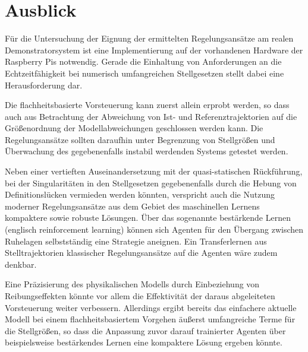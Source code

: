 \section{Ausblick}

Für die Untersuchung der Eignung der ermittelten Regelungsansätze am realen Demonstratorsystem ist eine Implementierung auf der vorhandenen Hardware der Raspberry Pis notwendig. Gerade die Einhaltung von Anforderungen an die Echtzeitfähigkeit bei numerisch umfangreichen Stellgesetzen stellt dabei eine Herausforderung dar.

Die flachheitsbasierte Vorsteuerung kann zuerst allein erprobt werden, so dass auch aus Betrachtung der Abweichung von Ist- und Referenztrajektorien auf die Größenordnung der Modellabweichungen geschlossen werden kann. Die Regelungsansätze sollten daraufhin unter Begrenzung von Stellgrößen und Überwachung des gegebenenfalls instabil werdenden Systems getestet werden.

Neben einer vertieften Auseinandersetzung mit der quasi-statischen Rückführung, bei der Singularitäten in den Stellgesetzen gegebenenfalls durch die Hebung von Definitionslücken vermieden werden könnten, verspricht auch die Nutzung moderner Regelungsansätze aus dem Gebiet des maschinellen Lernens kompaktere sowie robuste Lösungen. Über das sogenannte bestärkende Lernen (englisch reinforcement learning) können sich Agenten für den Übergang zwischen Ruhelagen selbstständig eine Strategie aneignen. Ein Transferlernen aus Stelltrajektorien klassischer Regelungsansätze auf die Agenten wäre zudem denkbar.

Eine Präzisierung des physikalischen Modells durch Einbeziehung von Reibungseffekten könnte vor allem die Effektivität der daraus abgeleiteten Vorsteuerung weiter verbessern. Allerdings ergibt bereits das einfachere aktuelle Modell bei einem flachheitsbasiertem Vorgehen äußerst umfangreiche Terme für die Stellgrößen, so dass die Anpassung zuvor darauf trainierter Agenten über beispielsweise bestärkendes Lernen eine kompaktere Lösung ergeben könnte.


